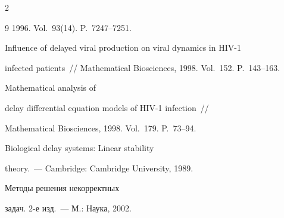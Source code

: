 \begin{multicols}{2}
{{\begin{thebibliography}{9}
1996. Vol.~93(14). P.~7247--7251.









Influence of delayed viral production on viral dynamics in HIV-1


infected patients~// Mathematical Biosciences, 1998. Vol.~152. P.~143--163.









Mathematical analysis of


delay differential equation models of HIV-1 infection~//


Mathematical Biosciences, 1998. Vol.~179. P.~73--94.









Biological delay systems: Linear stability


theory.~--- Cambridge: Cambridge University, 1989.





\label{end\stat}









Методы решения некорректных


задач. 2-е изд.~--- М.: Наука, 2002.


\end{thebibliography}





} 


}


\end{multicols}


